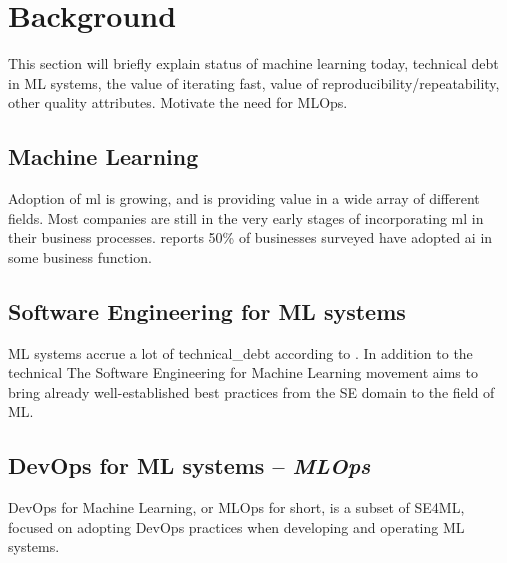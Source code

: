 \chapter{Background}
This section will briefly explain status of machine learning today, technical debt in ML systems, the value of iterating fast, value of reproducibility/repeatability, other quality attributes.
Motivate the need for MLOps.

\section{Machine Learning}
Adoption of \acrshort{ml} is growing, and is providing value in a wide array of different fields.
Most companies are still in the very early stages of incorporating \acrshort{ml} in their business processes.
\textcite{mckinsey2020} reports 50\% of businesses surveyed have adopted \acrshort{ai} in some business function.

\section{Software Engineering for ML systems}
ML systems accrue a lot of \gls{technical_debt} according to \textcite{Sculley2015}.
In addition to the technical
The Software Engineering for Machine Learning movement aims to bring already well-established best practices from the SE domain to the field of ML.

\section{DevOps for ML systems -- \emph{MLOps}}
DevOps for Machine Learning, or MLOps for short, is a subset of SE4ML, focused on adopting DevOps practices when developing and operating ML systems.